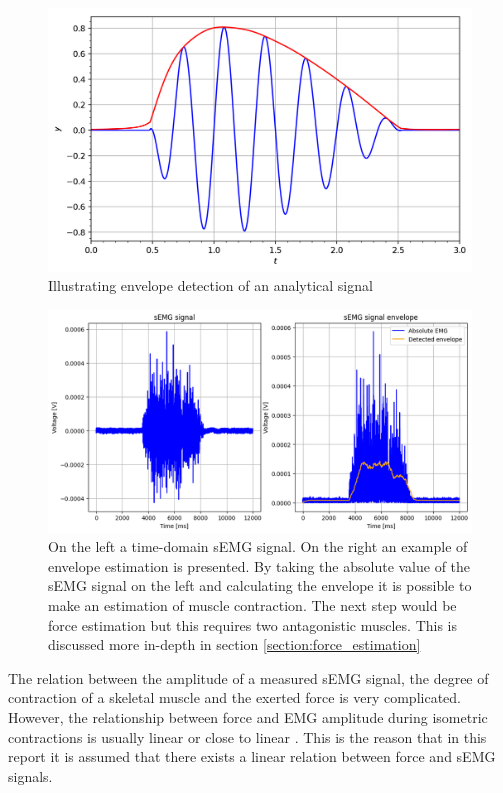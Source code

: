 \begin{figure}[h!t]
	\begin{center}
		\includegraphics[width=0.7\columnwidth]{images/envelope_wikipedia.png}
	\end{center}
	\caption{Illustrating envelope detection of an analytical signal \cite{envelope_wikipedia}}
	\label{fig:envelope_wikipedia}
\end{figure}

\begin{figure}[h!t]
	\begin{center}
		\includegraphics[width=1.0\columnwidth]{images/amplitude_force_estimation_example.png}
	\end{center}
	\caption{On the left a time-domain sEMG signal. On the right an example of envelope estimation is presented. By taking the absolute value of the sEMG signal on the left and calculating the envelope it is possible to make an estimation of muscle contraction. The next step would be force estimation but this requires two antagonistic muscles. This is discussed more in-depth in section \ref{section:force_estimation}}
	\label{fig:amplitude_estimation_example}
\end{figure}

The relation between the amplitude of a measured sEMG signal, the degree of contraction of a skeletal muscle and the exerted force is very complicated. However, the relationship between force and EMG amplitude during isometric contractions is usually linear or close to linear  \cite{interpreting_muscle_function_from_emg} \cite{adaptive_filter_dry_electrode}. This is the reason that in this report it is assumed that there exists a linear relation between force and sEMG signals.

